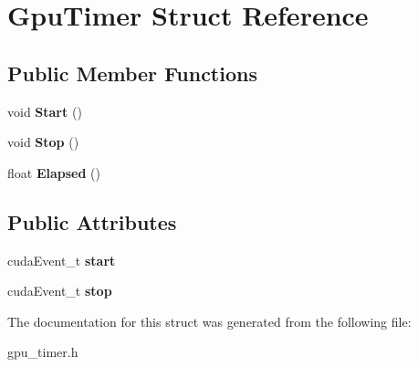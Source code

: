 \hypertarget{structGpuTimer}{\section{Gpu\-Timer Struct Reference}
\label{structGpuTimer}
}
\subsection*{Public Member Functions}
\begin{DoxyCompactItemize}
\item 
\hypertarget{structGpuTimer_aea406e4ac0e0b9aaec07a8c994b6376d}{void {\bfseries Start} ()}\label{structGpuTimer_aea406e4ac0e0b9aaec07a8c994b6376d}

\item 
\hypertarget{structGpuTimer_a0069f76bc4a8c9bf6544c2eee4f0bdde}{void {\bfseries Stop} ()}\label{structGpuTimer_a0069f76bc4a8c9bf6544c2eee4f0bdde}

\item 
\hypertarget{structGpuTimer_a2a162b7524824ad79601ec05428204a7}{float {\bfseries Elapsed} ()}\label{structGpuTimer_a2a162b7524824ad79601ec05428204a7}

\end{DoxyCompactItemize}
\subsection*{Public Attributes}
\begin{DoxyCompactItemize}
\item 
\hypertarget{structGpuTimer_a077cc22f2735e4bdae9ba0b16ae4f4f4}{cuda\-Event\-\_\-t {\bfseries start}}\label{structGpuTimer_a077cc22f2735e4bdae9ba0b16ae4f4f4}

\item 
\hypertarget{structGpuTimer_a06b6b0c573506758b49065d8a24436ec}{cuda\-Event\-\_\-t {\bfseries stop}}\label{structGpuTimer_a06b6b0c573506758b49065d8a24436ec}

\end{DoxyCompactItemize}


The documentation for this struct was generated from the following file\-:\begin{DoxyCompactItemize}
\item 
gpu\-\_\-timer.\-h\end{DoxyCompactItemize}
